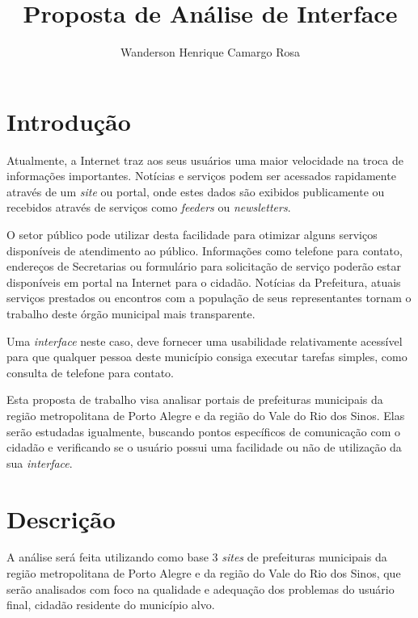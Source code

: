 \documentclass{article}
\title{Proposta de Análise de Interface}
\author{Wanderson Henrique Camargo Rosa\inst{1}}
\begin{document}
\maketitle{}

\section{Introdução}

Atualmente, a Internet traz aos seus usuários uma maior velocidade na troca de
informações importantes. Notícias e serviços podem ser acessados rapidamente
através de um \textit{site} ou portal, onde estes dados são exibidos
publicamente ou recebidos através de serviços como \textit{feeders} ou
\textit{newsletters}.

O setor público pode utilizar desta facilidade para otimizar alguns serviços
disponíveis de atendimento ao público. Informações como telefone para contato,
endereços de Secretarias ou formulário para solicitação de serviço poderão estar
disponíveis em portal na Internet para o cidadão. Notícias da Prefeitura, atuais
serviços prestados ou encontros com a população de seus representantes tornam o
trabalho deste órgão municipal mais transparente.

Uma \textit{interface} neste caso, deve fornecer uma usabilidade relativamente
acessível para que qualquer pessoa deste município consiga executar tarefas
simples, como consulta de telefone para contato.

Esta proposta de trabalho visa analisar portais de prefeituras municipais da
região metropolitana de Porto Alegre e da região do Vale do Rio dos Sinos. Elas
serão estudadas igualmente, buscando pontos específicos de comunicação com o
cidadão e verificando se o usuário possui uma facilidade ou não de utilização da
sua \textit{interface}.

\section{Descrição}

A análise será feita utilizando como base 3 \textit{sites} de prefeituras
municipais da região metropolitana de Porto Alegre e da região do Vale do Rio
dos Sinos, que serão analisados com foco na qualidade e adequação dos problemas
do usuário final, cidadão residente do município alvo.
\end{document}
